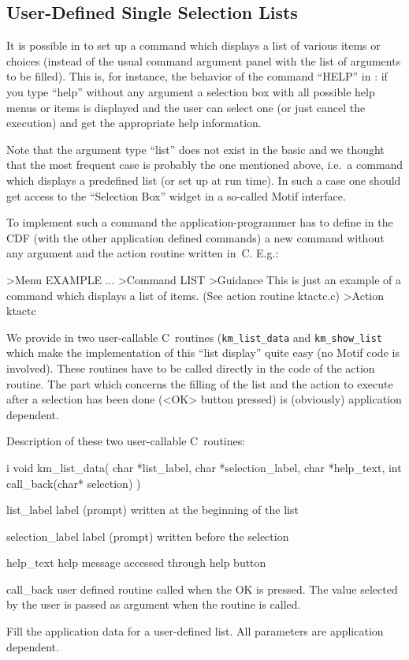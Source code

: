  
\subsection{User-Defined Single Selection Lists}
 
It is possible in \KUIPMotif{} to set up a command which displays a
list of various items or choices (instead of the usual command
argument panel with the list of arguments to be filled).
This is,
for instance, the behavior of the command ``HELP'' in \KUIPMotif{}:
if you type ``help'' without any argument a selection box with all
possible help menus or items is displayed and the user can select
one (or just cancel the execution) and get the appropriate help information.
 
Note that the argument type ``list'' does not exist in the basic
\KUIP{} and we thought that the most frequent case is probably
the one mentioned above, i.e.\ a command which displays a predefined list
(or set up at run time). In such a case one should get access
to the ``Selection Box'' widget in a so-called Motif interface.
 
To implement such a command the application-programmer has to define
in the CDF (with the other application defined commands) a new command
without any argument and the action routine written in~C. 
E.g.:
\begin{XMP}
>Menu EXAMPLE
...
>Command LIST
>Guidance
This is just an example of a command which
displays a list of items.
(See action routine ktactc.c)
>Action ktactc%
\end{XMP}
We provide in \KUIPMotif{} two user-callable C~routines (\texttt{km_list_data}
and \texttt{km_show_list} which make the implementation of this ``list display''
quite easy (no Motif code is involved). These routines have to be called
directly in the code of the action routine. The part which concerns the
filling of the list and the action to execute after a selection has been
done (<OK> button pressed) is (obviously) application dependent.
 
Description of these two user-callable C~routines:

\begin{Gray}{i}
void km_list_data( char *list_label, char *selection_label,
                   char *help_text,  int call_back(char* selection) )
\end{Gray}
\Pdesc\begin{DLtt}{\mbox{\hspace{7em}}}
\item[list_label]  label (prompt) written at the beginning of the list
\item[selection_label]  label (prompt) written before the selection
\item[help_text]  help message accessed through help button
\item[call_back]  user defined routine called when the OK is pressed.
  The value selected by the user is passed as argument when the
  routine is called.
\end{DLtt}
Fill the application data for a user-defined list.
All parameters are application dependent.


